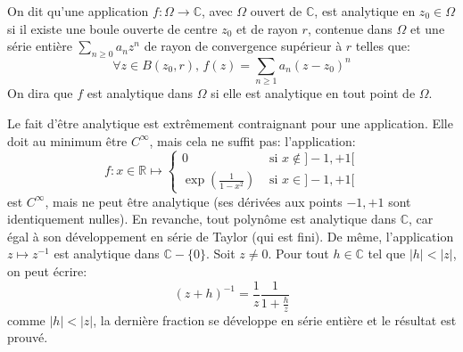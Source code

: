 \begin{fdefn}
On dit qu'une application $f : \Omega \to \mathbb{C}$, avec $\Omega$ ouvert de
$\mathbb{C}$, est analytique en $z_0 \in \Omega$ si il existe une boule ouverte
de centre $z_0$ et de rayon $r$, contenue dans $\Omega$ et une série entière
$\sum_{n \geq 0}a_n z^n$ de rayon de convergence supérieur à $r$ telles que:
\[
\forall z \in B(z_0,r), \, f(z) = \sum_{n \geq 1}a_n(z-z_0)^n
\]
On dira que $f$ est analytique dans $\Omega$ si elle est analytique en tout
point de $\Omega$.
\end{fdefn}
Le fait d'être analytique est extrêmement contraignant pour une application.
Elle doit au minimum être $C^\infty$, mais cela ne suffit pas: l'application:
\[
f \colon x \in \mathbb{R} \mapsto \left\{
\begin{array}{cc}
0 & \text{ si } x \notin ]-1,+1[ \\
\exp\left(\frac{1}{1-x^2}\right) &  \text{ si } x \in ]-1,+1[
\end{array}
\right.
\]
est $C^\infty$, mais ne peut être analytique (ses dérivées aux points $-1,+1$
sont identiquement nulles).
En revanche, tout polynôme est analytique dans $\mathbb{C}$, car égal à son
développement en série de Taylor (qui est fini). De même, l'application $z
\mapsto z^{-1}$ est analytique dans $\mathbb{C}-\{0\}$. Soit $z \neq 0$. Pour
tout $h \in \mathbb{C}$ tel que $|h|<|z|$, on peut écrire:
\[
(z+h)^{-1}=  \frac{1}{z}\frac{1}{1+\frac{h}{z}}
\]
comme $|h|<|z|$, la dernière fraction se développe en série entière et le
résultat est prouvé.

